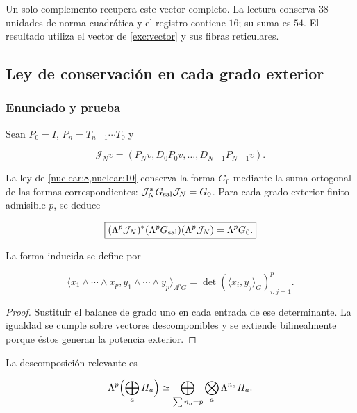 Un solo complemento recupera este vector completo.
La lectura conserva \(38\) unidades de norma cuadrática y el
registro contiene \(16\); su suma es \(54\).
El resultado utiliza el vector de \eqref{exc:vector} y sus fibras
reticulares.

\subsection{Ley de conservación en cada grado exterior}

\subsubsection{Enunciado y prueba}

Sean \(P_0=I\), \(P_n=T_{n-1}\cdots T_0\) y



\[
\mathcal J_Nv=(P_Nv,D_0P_0v,\ldots,D_{N-1}P_{N-1}v).
\]



La ley de \cref{nuclear:8,nuclear:10} conserva la forma \(G_0\)
mediante la suma ortogonal de las formas correspondientes:
\(\mathcal J_N^*G_{\rm sal}\mathcal J_N=G_0\).
Para cada grado exterior finito admisible \(p\), se deduce



\begin{equation}
\boxed{
(\Lambda^p\mathcal J_N)^*(\Lambda^pG_{\rm sal})
(\Lambda^p\mathcal J_N)=\Lambda^pG_0.
}
\label{nuc11:eq:20}
\end{equation}



La forma inducida se define por



\[
\langle x_1\wedge\cdots\wedge x_p,
y_1\wedge\cdots\wedge y_p\rangle_{\Lambda^pG}
=\det(\langle x_i,y_j\rangle_G)_{i,j=1}^p.
\]



\begin{proof}
Sustituir el balance de grado uno en cada entrada de ese determinante. La igualdad se cumple sobre vectores descomponibles y se extiende bilinealmente porque éstos generan la potencia exterior.
\end{proof}

La descomposición relevante es



\[
\Lambda^p\Bigl(\bigoplus_aH_a\Bigr)
\simeq\bigoplus_{\sum n_a=p}\bigotimes_a\Lambda^{n_a}H_a.
\]




